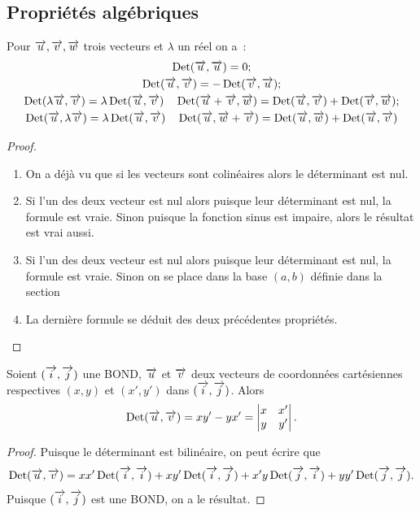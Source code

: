 \subsection{Propriétés algébriques}
\begin{prop}
Pour \(\vu, \vv, \vw\) trois vecteurs et \(\lambda\) un réel on a~:
\begin{gather}
  \Det(\vu,\vu)=0;\\
  \Det(\vu, \vv)=-\Det(\vv, \vu);\\
  \Det( \lambda \vu, \vv) = \lambda \Det(\vu, \vv) \quad \Det(\vu+ \vv, \vw) =\Det(\vu, \vv) + \Det(\vv, \vw);\\
  \Det(\vu, \lambda \vv) = \lambda \Det(\vu, \vv) \quad \Det(\vu, \vw + \vv) =\Det(\vu, \vw) + \Det(\vu, \vv)
\end{gather}
\end{prop}
\begin{proof}
\begin{enumerate}
\item On a déjà vu que si les vecteurs sont colinéaires alors le déterminant est nul.
\item Si l'un des deux vecteur est nul alors puisque leur déterminant est nul, la formule est vraie. Sinon puisque la fonction sinus est impaire, alors le résultat est vrai aussi.
\item Si l'un des deux vecteur est nul alors puisque leur déterminant est nul, la formule est vraie. Sinon on se place dans la base \((a,b)\) définie dans la section~
\item La dernière formule se déduit des deux précédentes propriétés.
\end{enumerate}
\end{proof}
\begin{prop}
Soient \((\vi,\vj)\) une BOND, \(\vu\) et \(\vv\) deux vecteurs de coordonnées cartésiennes respectives \((x,y)\) et \((x',y')\) dans \((\vi,\vj)\). Alors 
\begin{equation}
  \Det(\vu,\vv)=xy'-yx'=\begin{vmatrix} x&x'\\y&y'\end{vmatrix}.
\end{equation}
\end{prop}
\begin{proof}
  Puisque le déterminant est bilinéaire, on peut écrire que
  \begin{equation}
    \Det(\vu,\vv)=xx' \Det(\vi,\vi) + xy' \Det(\vi,\vj)+x'y\Det(\vj,\vi)+yy'\Det(\vj,\vj).
  \end{equation}
  Puisque \((\vi,\vj)\) est une BOND, on a le résultat.
\end{proof}
